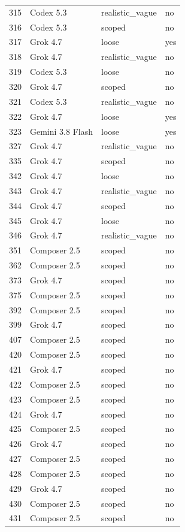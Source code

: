 \begin{tabular}{llll}
315 & Codex 5.3 & realistic\_vague & no \\
316 & Codex 5.3 & scoped & no \\
317 & Grok 4.7 & loose & yes \\
318 & Grok 4.7 & realistic\_vague & no \\
319 & Codex 5.3 & loose & no \\
320 & Grok 4.7 & scoped & no \\
321 & Codex 5.3 & realistic\_vague & no \\
322 & Grok 4.7 & loose & yes \\
323 & Gemini 3.8 Flash & loose & yes \\
327 & Grok 4.7 & realistic\_vague & no \\
335 & Grok 4.7 & scoped & no \\
342 & Grok 4.7 & loose & no \\
343 & Grok 4.7 & realistic\_vague & no \\
344 & Grok 4.7 & scoped & no \\
345 & Grok 4.7 & loose & no \\
346 & Grok 4.7 & realistic\_vague & no \\
351 & Composer 2.5 & scoped & no \\
362 & Composer 2.5 & scoped & no \\
373 & Grok 4.7 & scoped & no \\
375 & Composer 2.5 & scoped & no \\
392 & Composer 2.5 & scoped & no \\
399 & Grok 4.7 & scoped & no \\
407 & Composer 2.5 & scoped & no \\
420 & Composer 2.5 & scoped & no \\
421 & Grok 4.7 & scoped & no \\
422 & Composer 2.5 & scoped & no \\
423 & Composer 2.5 & scoped & no \\
424 & Grok 4.7 & scoped & no \\
425 & Composer 2.5 & scoped & no \\
426 & Grok 4.7 & scoped & no \\
427 & Composer 2.5 & scoped & no \\
428 & Composer 2.5 & scoped & no \\
429 & Grok 4.7 & scoped & no \\
430 & Composer 2.5 & scoped & no \\
431 & Composer 2.5 & scoped & no \\

\end{tabular}
